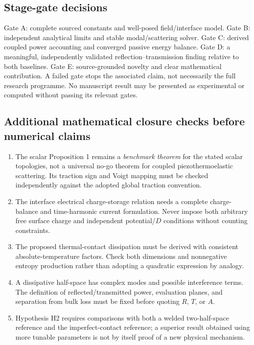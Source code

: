 \documentclass[11pt]{article}
\begin{document}
\subsection*{Stage-gate decisions}
Gate A: complete sourced constants and well-posed field/interface model. Gate B:
independent analytical limits and stable modal/scattering solver. Gate C: derived
coupled power accounting and converged passive energy balance. Gate D: a
meaningful, independently validated reflection--transmission finding relative to
both baselines. Gate E: source-grounded novelty and clear mathematical
contribution. A failed gate stops the associated claim, not necessarily the full
research programme. No manuscript result may be presented as experimental or
computed without passing its relevant gates.

\subsection*{Additional mathematical closure checks before numerical claims}
\begin{enumerate}
  \item The scalar Proposition 1 remains a \emph{benchmark theorem} for the stated
    scalar topologies, not a universal no-go theorem for coupled
    piezothermoelastic scattering. Its traction sign and Voigt mapping must be
    checked independently against the adopted global traction convention.
  \item The interface electrical charge-storage relation needs a complete
    charge-balance and time-harmonic current formulation. Never impose both
    arbitrary free surface charge and independent potential/$D$ conditions
    without counting constraints.
  \item The proposed thermal-contact dissipation must be derived with consistent
    absolute-temperature factors. Check both dimensions and nonnegative entropy
    production rather than adopting a quadratic expression by analogy.
  \item A dissipative half-space has complex modes and possible interference
    terms. The definition of reflected/transmitted power, evaluation planes, and
    separation from bulk loss must be fixed before quoting $R$, $T$, or $A$.
  \item Hypothesis H2 requires comparisons with both a welded two-half-space
    reference and the imperfect-contact reference; a superior result obtained
    using more tunable parameters is not by itself proof of a new physical
    mechanism.
\end{enumerate}
\end{document}
